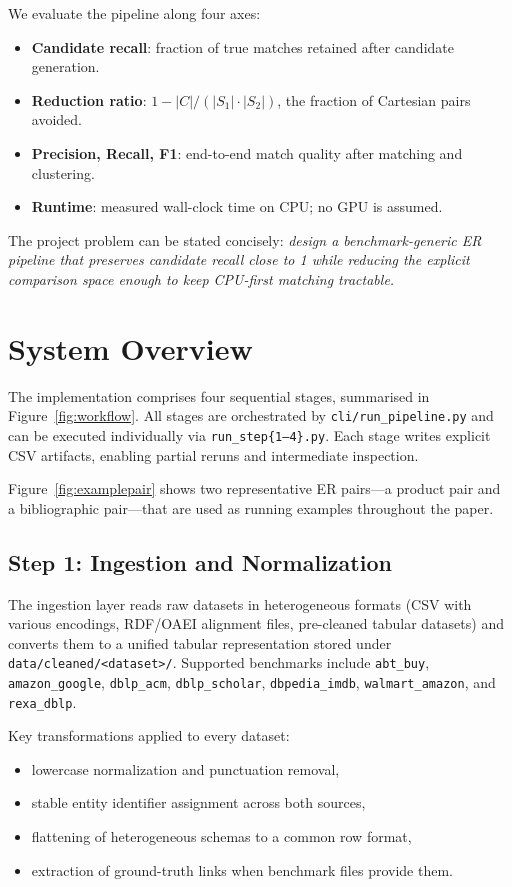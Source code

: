 \documentclass[10pt,twocolumn]{article}
\begin{document}
We evaluate the pipeline along four axes:
\begin{itemize}
  \item \textbf{Candidate recall}: fraction of true matches retained after
    candidate generation.
  \item \textbf{Reduction ratio}: $1 - |C| / (|S_1|\cdot|S_2|)$, the
    fraction of Cartesian pairs avoided.
  \item \textbf{Precision, Recall, F1}: end-to-end match quality after
    matching and clustering.
  \item \textbf{Runtime}: measured wall-clock time on CPU; no GPU is assumed.
\end{itemize}

The project problem can be stated concisely: \emph{design a benchmark-generic
ER pipeline that preserves candidate recall close to 1 while reducing
the explicit comparison space enough to keep CPU-first matching tractable.}

\section{System Overview}

The implementation comprises four sequential stages, summarised in
Figure~\ref{fig:workflow}. All stages are orchestrated by
\texttt{cli/run\_pipeline.py} and can be executed individually via
\texttt{run\_step\{1--4\}.py}. Each stage writes explicit CSV artifacts,
enabling partial reruns and intermediate inspection.

Figure~\ref{fig:examplepair} shows two representative ER pairs---a product
pair and a bibliographic pair---that are used as running examples throughout
the paper.

\subsection{Step 1: Ingestion and Normalization}

The ingestion layer reads raw datasets in heterogeneous formats (CSV with
various encodings, RDF/OAEI alignment files, pre-cleaned tabular datasets)
and converts them to a unified tabular representation stored under
\texttt{data/cleaned/<dataset>/}. Supported benchmarks include
\texttt{abt\_buy}, \texttt{amazon\_google}, \texttt{dblp\_acm},
\texttt{dblp\_scholar}, \texttt{dbpedia\_imdb}, \texttt{walmart\_amazon},
and \texttt{rexa\_dblp}.

Key transformations applied to every dataset:
\begin{itemize}
  \item lowercase normalization and punctuation removal,
  \item stable entity identifier assignment across both sources,
  \item flattening of heterogeneous schemas to a common row format,
  \item extraction of ground-truth links when benchmark files provide them.
\end{itemize}
\end{document}
